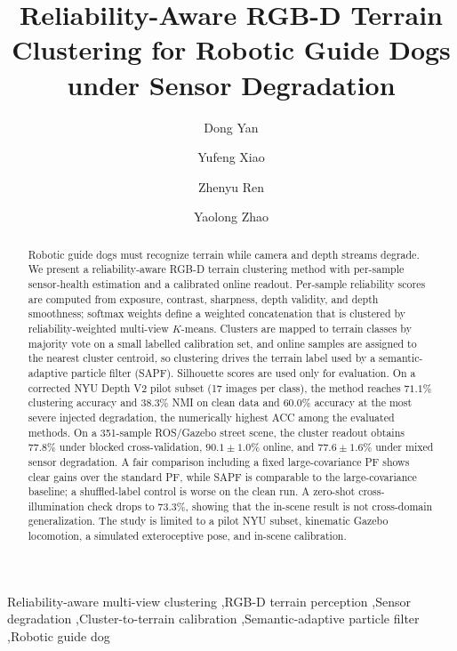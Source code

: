 \documentclass[final,3p,times]{elsarticle}
\begin{document}
\begin{frontmatter}

\title{Reliability-Aware RGB-D Terrain Clustering for Robotic Guide Dogs under Sensor Degradation}

\author[inst1]{Dong Yan}
\author[inst1]{Yufeng Xiao}

\author[inst1]{Zhenyu Ren}
\author[inst1]{Yaolong Zhao}


\begin{abstract}
Robotic guide dogs must recognize terrain while camera and depth streams degrade. We present a reliability-aware RGB-D terrain clustering method with per-sample sensor-health estimation and a calibrated online readout. Per-sample reliability scores are computed from exposure, contrast, sharpness, depth validity, and depth smoothness; softmax weights define a weighted concatenation that is clustered by reliability-weighted multi-view $K$-means. Clusters are mapped to terrain classes by majority vote on a small labelled calibration set, and online samples are assigned to the nearest cluster centroid, so clustering drives the terrain label used by a semantic-adaptive particle filter (SAPF). Silhouette scores are used only for evaluation. On a corrected NYU Depth V2 pilot subset (17 images per class), the method reaches $71.1\%$ clustering accuracy and $38.3\%$ NMI on clean data and $60.0\%$ accuracy at the most severe injected degradation, the numerically highest ACC among the evaluated methods. On a 351-sample ROS/Gazebo street scene, the cluster readout obtains $77.8\%$ under blocked cross-validation, $90.1\pm1.0\%$ online, and $77.6\pm1.6\%$ under mixed sensor degradation. A fair comparison including a fixed large-covariance PF shows clear gains over the standard PF, while SAPF is comparable to the large-covariance baseline; a shuffled-label control is worse on the clean run. A zero-shot cross-illumination check drops to 73.3\%, showing that the in-scene result is not cross-domain generalization. The study is limited to a pilot NYU subset, kinematic Gazebo locomotion, a simulated exteroceptive pose, and in-scene calibration.
\end{abstract}

\begin{keyword}
Reliability-aware multi-view clustering \sep RGB-D terrain perception \sep Sensor degradation \sep Cluster-to-terrain calibration \sep Semantic-adaptive particle filter \sep Robotic guide dog
\end{keyword}

\end{frontmatter}
\end{document}
